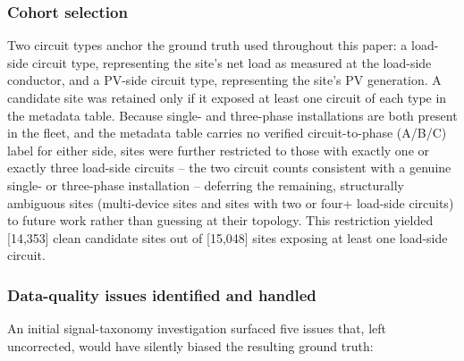 \subsubsection*{Cohort selection}
Two circuit types anchor the ground truth used throughout this paper: a
load-side circuit type, representing the site's net load as measured at
the load-side conductor, and a PV-side circuit type, representing the
site's PV generation. A candidate site was retained only if it exposed at
least one circuit of each type in the metadata table. Because single- and
three-phase installations are both present in the fleet, and the
metadata table carries no verified circuit-to-phase (A/B/C) label for
either side, sites were further restricted to those with exactly one or
exactly three load-side circuits -- the two circuit counts consistent
with a genuine single- or three-phase installation -- deferring the
remaining, structurally ambiguous sites (multi-device sites and sites
with two or four+ load-side circuits) to future work rather than guessing
at their topology. This restriction yielded [14{,}353] clean candidate
sites out of [15{,}048] sites exposing at least one load-side circuit.

\subsubsection*{Data-quality issues identified and handled}
An initial signal-taxonomy investigation surfaced five issues that, left
uncorrected, would have silently biased the resulting ground truth:

